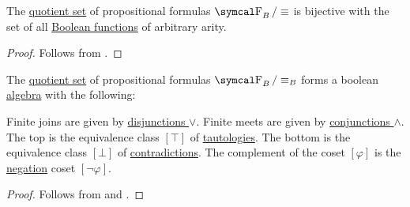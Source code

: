 \begin{theorem}\label{thm:propositional_formula_cosets_are_boolean_functions}
  The \hyperref[def:equivalence_relation]{quotient set} of propositional formulas \( \CF_B / \equiv \) is bijective with the set of all \hyperref[def:boolean_function]{Boolean functions} of arbitrary arity.
\end{theorem}
\begin{proof}
  Follows from .
\end{proof}

\begin{corollary}\label{thm:propositional_logic_boolean_algebra}
  The \hyperref[def:equivalence_relation]{quotient set} of propositional formulas \( \CF_B / \equiv_B \) forms a boolean \hyperref[def:boolean_algebra]{algebra} with the following:
  \begin{RefList}
     Finite joins are given by \hyperref[def:propositional_alphabet/connectives/disjunction]{disjunctions \( \vee \)}.
     Finite meets are given by \hyperref[def:propositional_alphabet/connectives/conjunction]{conjunctions \( \wedge \)}.
     The top is the equivalence class \( [\top] \) of \hyperref[def:propositional_interpretation/tautology]{tautologies}.
     The bottom is the equivalence class \( [\bot] \) of \hyperref[def:propositional_interpretation/contradiction]{contradictions}.
     The complement of the coset \( [\varphi] \) is the \hyperref[def:propositional_alphabet/negation]{negation} coset \( [\neg \varphi] \).
  \end{RefList}
\end{corollary}
\begin{proof}
  Follows from  and .
\end{proof}

